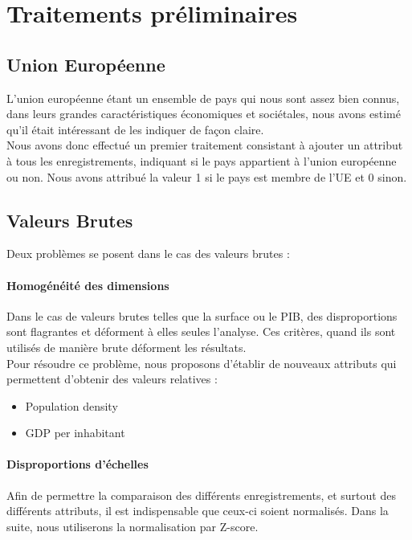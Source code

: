 \section{Traitements préliminaires}

\subsection{Union Européenne}
L'union européenne étant un ensemble de pays qui nous sont assez bien connus, dans leurs grandes caractéristiques économiques et sociétales, nous avons estimé qu'il était intéressant de les indiquer de façon claire.\\
Nous avons donc effectué un premier traitement consistant à ajouter un attribut à tous les enregistrements, indiquant si le pays appartient à l'union européenne ou non. Nous avons attribué la valeur 1 si le pays est membre de l'UE et 0 sinon. \\

\subsection{Valeurs Brutes}
Deux problèmes se posent dans le cas des valeurs brutes : 
\paragraph{Homogénéité des dimensions} Dans le cas de valeurs brutes telles que la surface ou le PIB, des disproportions sont flagrantes et déforment à elles seules l'analyse. Ces critères, quand ils sont utilisés de manière brute déforment les résultats.\\
Pour résoudre ce problème, nous proposons d'établir de nouveaux attributs qui permettent d'obtenir des valeurs relatives : 
\begin{itemize}
	\item Population density 
	\item GDP per inhabitant
\end{itemize}

\paragraph{Disproportions d'échelles}
Afin de permettre la comparaison des différents enregistrements, et surtout des différents attributs, il est indispensable que ceux-ci soient normalisés.
Dans la suite, nous utiliserons la normalisation par Z-score.







